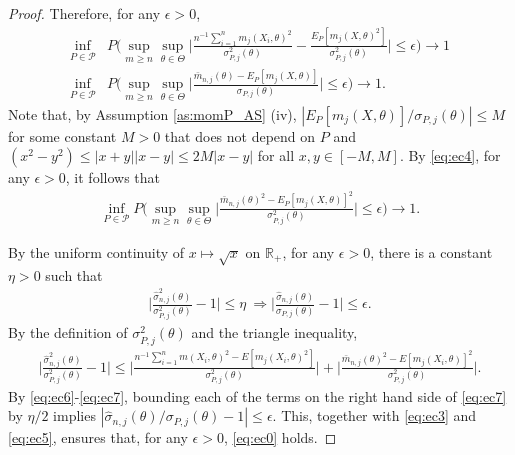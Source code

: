 \documentclass[letterpaper,11pt]{article}
\theoremstyle{myplain}
\theoremstyle{mydefinition}
\theoremstyle{myremark}
\numberwithin{equation}{section}
\numberwithin{figure}{section}
\begin{document}
\begin{appendices}
\begin{proof}
Therefore, for any $\epsilon>0$, 
\begin{align}
\inf_{P\in\mathcal P}&P\Big(	\sup_{m\ge n}\sup_{\theta\in\Theta}\Big|\frac{n^{-1}\sum_{i=1}^n m_{j}(X_i,\theta)^2}{\sigma^2_{P,j}(\theta)}-\frac{E_P[m_j(X,\theta)^2]}{\sigma^2_{P,j}(\theta)}\Big|\le \epsilon\Big)\to 1\label{eq:ec3}\\	
\inf_{P\in\mathcal P}&P\Big(\sup_{m\ge n}\sup_{\theta\in\Theta}\Big|\frac{\bar m_{n,j}(\theta)-E_P[m_j(X,\theta)]}{\sigma_{P,j}(\theta)}\Big|\le \epsilon\Big)\to 1.\label{eq:ec4}
\end{align}
Note that, by  Assumption \ref{as:momP_AS} (iv), $|E_P[m_j(X,\theta)]/\sigma_{P,j}(\theta)|\le M$  for some constant $M>0$ that does not depend on $P$ and $(x^2-y^2)\le |x+y||x-y|\le 2M|x-y|$ for all $x,y\in [-M,M]$. By \eqref{eq:ec4},   for any $\epsilon>0$, it follows that
\begin{align}
	\inf_{P\in\mathcal P}P\Big(\sup_{m\ge n}\sup_{\theta\in\Theta}\Big|\frac{\bar m_{n,j}(\theta)^2-E_P[m_j(X,\theta)]^2}{\sigma^2_{P,j}(\theta)}\Big|\le \epsilon\Big)\to 1.\label{eq:ec5}
\end{align}

By the uniform continuity of $x\mapsto \sqrt x$ on $\mathbb R_+$, for any $\epsilon>0$, there is a constant $\eta>0$ such that
\begin{align}
\Big|\frac{\hat\sigma^2_{n,j}(\theta)}{\sigma^2_{P,j}(\theta)}-1\Big|\le \eta~\Rightarrow \Big|\frac{\hat\sigma_{n,j}(\theta)}{\sigma_{P,j}(\theta)}-1\Big|\le \epsilon.\label{eq:ec6}
\end{align}	
By the definition of $\sigma^2_{P,j}(\theta)$ and the triangle inequality,
\begin{align}
\Big|\frac{\hat\sigma^2_{n,j}(\theta)}{\sigma^2_{P,j}(\theta)}-1\Big|
\le \Big|\frac{n^{-1}\sum_{i=1}^n m(X_i,\theta)^2-E[m_j(X_i,\theta)^2]}{\sigma^2_{P,j}(\theta)}	\Big|+\Big|\frac{\bar m_{n,j}(\theta)^2-E[m_j(X_i,\theta)]^2}{\sigma^2_{P,j}(\theta)}\Big|.\label{eq:ec7}
\end{align}
By \eqref{eq:ec6}-\eqref{eq:ec7}, bounding each of the terms on the right hand side of \eqref{eq:ec7} by $\eta/2$ implies $|\hat\sigma_{n,j}(\theta)/\sigma_{P,j}(\theta)-1|\le \epsilon$.
This, together with \eqref{eq:ec3} and \eqref{eq:ec5}, ensures that, for any $\epsilon>0$, \eqref{eq:ec0} holds.


\end{proof}
\end{appendices}
\end{document}
